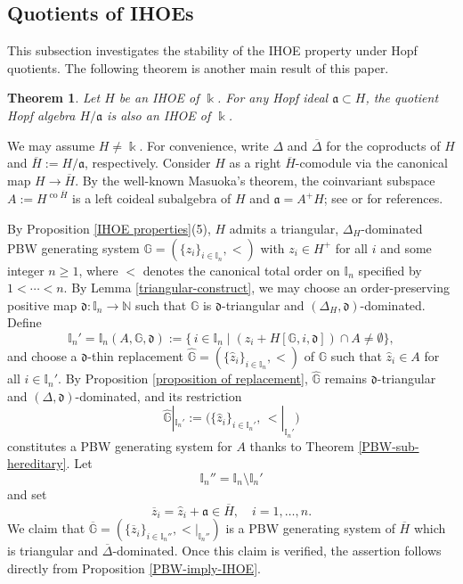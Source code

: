 \documentclass{article}
\makeatletter
\renewenvironment{proof}[1][\proofname]{\par
	\pushQED{\qed}%
	\normalfont \topsep6\p@\@plus6\p@\relax
	\trivlist
	\item[\hskip\labelsep
	\bfseries
	#1\@addpunct{.}]\ignorespaces
}{%
	\popQED\endtrivlist\@endpefalse
}
\theoremstyle{plain}
\newtheorem{thm}{Theorem}[section]
\theoremstyle{definition}
\numberwithin{equation}{section}
\newcommand{\GG}{\mathbb{G}}
\newcommand{\II}{\mathbb{I}}
\newcommand{\dd}{\mathfrak{d}}
\makeatother
\begin{document}
	\subsection{Quotients of IHOEs}
	
	This subsection investigates the stability of the IHOE property under Hopf quotients. The following theorem is another main result of this paper.
	
	\begin{thm}\label{Quotients-IHOE}
		Let $H$ be an IHOE of $\Bbbk$. For any Hopf ideal $\mathfrak{a}\subset H$, the quotient Hopf algebra $H/\mathfrak{a}$ is also an IHOE of $\Bbbk$.
	\end{thm}
	
	\begin{proof}
		We may assume $H\neq \Bbbk$. For convenience, write $\Delta$ and $\overline{\Delta}$ for the coproducts of $H$ and $\overline{H}:=H/\mathfrak{a}$, respectively. Consider $H$ as a right $\overline{H}$-comodule via the canonical map $H\to \overline{H}$. By the well-known Masuoka's theorem, the  coinvariant  subspace $A:=H^{\operatorname{co} \overline{H}}$  is a left coideal subalgebra of $H$ and $\mathfrak{a}=A^{+}H$; see \cite{Ma91} or \cite[Theorem 6.3.2]{HS20} for references.
		
		By Proposition \ref{IHOE properties}(5), $H$ admits a triangular, $\Delta_H$-dominated PBW generating system $\GG=(\{z_i\}_{i\in \II_{n}}, <)$ with $z_i\in H^+$ for all $i$ and some integer $n\ge 1$, where $<$ denotes the canonical total order on $\II_n$ specified by $1<\cdots <n$. By Lemma \ref{triangular-construct}, we may choose an order-preserving positive map $\dd\colon\II_{n}\to\mathbb{N}$ such that $\GG$ is $\dd$-triangular and $(\Delta_{H},\dd)$-dominated. Define
		\[
		\II_{n}'=\II_{n}(A,\GG,\mathfrak{d}):=\{\, i\in\II_{n}\mid (z_{i}+H[\GG,i,\mathfrak{d}]) \cap A \neq \emptyset\},
		\]
		and choose a $\mathfrak{d}$-thin replacement $\hat{\GG}=(\{\hat{z}_{i}\}_{i\in \II_{n}}, <)$ of $\GG$ such that $\hat{z}_{i} \in A$ for all $i\in \II_{n}'$.  By Proposition \ref{proposition of replacement}, $\hat{\GG}$ remains $\mathfrak{d}$-triangular and $(\Delta, \mathfrak{d})$-dominated, and its restriction
		\[
		\hat{\GG}|_{\II_{n}'}:= \bigl(\{\hat{z}_{i}\}_{i\in \II_{n}'},\, {<}|_{\II_{n}'}\bigr)
		\]
		constitutes a PBW generating system for $A$ thanks to Theorem \ref{PBW-sub-hereditary}. Let $$\II_{n}''=\II_{n}\setminus\II_{n}'$$ and set
		\[
		\overline{z}_{i} = \hat{z}_{i} + \mathfrak{a} \in \overline{H}, \quad i=1,\ldots, n.
		\]
		We claim that $\overline{\GG}=(\{\overline{z}_{i}\}_{i\in \II_{n}''},{<}|_{\II_{n}''})$
		is a PBW generating system of $\overline{H}$ which is triangular and $\overline{\Delta}$-dominated. Once this claim is verified, the assertion follows directly from Proposition \ref{PBW-imply-IHOE}.
		

\end{proof}
\end{document}
